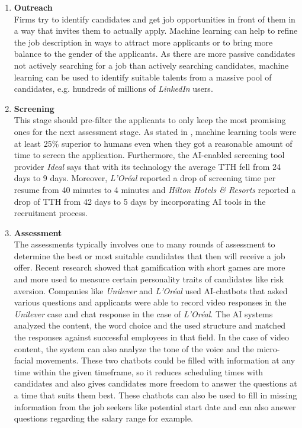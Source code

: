\documentclass[draft,final]{thesisclass} %
\begin{document}
\begin{enumerate}
    \item \textbf{Outreach}\\
    Firms try to identify candidates and get job opportunities in front of them in a way that invites them to
    actually apply. Machine learning can help to refine the job description in ways to attract more applicants or to bring more balance to the gender of the applicants. As there are more passive candidates not actively searching for a job than actively searching candidates, machine learning can be used to identify suitable talents from a massive pool of candidates, e.g. hundreds of millions of \textit{LinkedIn} users.
    \item \textbf{Screening}\\
    This stage should pre-filter the applicants to only keep the most promising ones for the next assessment stage.
    As stated in \cite[6]{ai_recruiting}, machine learning tools were at least 25\% superior to humans even when they got a reasonable amount of time to screen the application. Furthermore, the AI-enabled screening tool provider \textit{Ideal} says that with its technology the average \gls{TTH} fell from 24 days to 9 days.
    Moreover, \textit{L'Oréal} reported a drop of screening time per resume from 40 minutes to 4 minutes and \textit{Hilton Hotels \& Resorts} reported a drop of \gls{TTH} from 42 days to 5 days by incorporating AI tools in the recruitment process.
    \item \textbf{Assessment}\\
    The assessments typically involves one to many rounds of assessment to determine the best or most suitable candidates that then will receive a job offer. Recent research showed that gamification with short games are more and more used to measure certain personality traits of candidates like risk aversion. Companies like \textit{Unilever} and \textit{L'Oréal} used AI-chatbots that asked various questions and applicants were able to record video responses in the \textit{Unilever} case and chat response in the case of \textit{L'Oréal}. The AI systems analyzed the content, the word choice and the used structure and matched the responses against successful employees in that field. In the case of video content, the system can also analyze the tone of the voice and the micro-facial movements. These two chatbots could be filled with information at any time within the given timeframe, so it reduces scheduling times with candidates and also gives candidates more freedom to answer the questions at a time that suits them best. These chatbots can also be used to fill in missing information from the job seekers like potential start date and can also answer questions regarding the salary range for example.

\end{enumerate}
\end{document}
